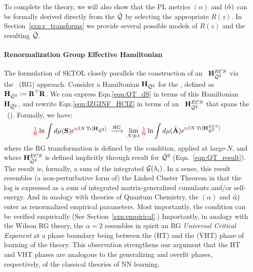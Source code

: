 To complete the theory, we
will also show that the \HTSR PL \LayerQuality metrics \ALPHA $(\alpha)$  and \ALPHAHAT $(\hat\alpha)$
can be formally derived directly from the \SETOL \LayerQuality $\bar{\mathcal{Q}}$ by selecting the appropriate
\RTransform $R(z)$. In Section~\ref{sxn:r_transforms} we provide several possible
models of $R(z)$ and the resulting \LayerQuality $\bar{\mathcal{Q}}$.

\paragraph{Renormalization Group Effective Hamiltonian}
The formulation of SETOL closely parallels the construction of an \EffectiveHamiltonian~$\mathbf{H}^{ECS}_{\bar{\mathcal{Q}}^{2}}$
via the \WilsonExactRenormalizationGroup~(RG) approach. Consider a \emph{\Bare} Hamiltonian $\mathbf{H}_{\bar{\mathcal{Q}}^{2}}$ for the \LayerQualitySquared,
defined as $\mathbf{H}_{\bar{\mathcal{Q}}^{2}}:= \mathbf{R}^{\top}\mathbf{R}$.
We can express Eqn.\ref{eqn:QT_dS} in terms of this \Bare Hamiltonian $\mathbf{H}_{\bar{\mathcal{Q}}^{2}}$,
and rewrite Eqn.\ref{eqn:IZGINF_HCIZ} in terms of an \emph{\Renormalized} \EffectiveHamiltonian~$\mathbf{H}^{ECS}_{\bar{\mathcal{Q}}^{2}}$
that spans the \EffectiveCorrelationSpace~(\ECS). Formally, we have:
\begin{align}
\label{eqn:RG}
{\color{red}\sf{\tfrac{1}{N}}}\ln \int d\mu({\mathbf{S}})e^{{\color{red}\sf{n}} \beta N \operatorname{Tr}[\mathbf{H}_{\bar{\mathcal{Q}}^{2}}]} \;\xrightarrow{RG}\; \lim_{N\gg 1}{\color{red}\sf{\tfrac{1}{N}}}\ln \int d\mu(\tilde{\mathbf{A}})e^{{\color{red}\sf{n}} \beta N \operatorname{Tr}[\mathbf{H}^{ECS}_{\bar{\mathcal{Q}}^{2}}]} 
\end{align}
where the RG transformation is defined by the \ScaleInvariant \TRACELOG condition,
applied at large-$N$,
and where $\mathbf{H}^{ECS}_{\bar{\mathcal{Q}}^{2}}$ is defined implicitly through result for $\bar{\mathcal{Q}}^{2}$ (Eqn.~\ref{eqn:QT_result}).
The result is, formally, a sum of the integrated \RTransforms $\mathcal{G}(\lambda_{i})$.
In a sense, this result resembles (a non-perturbative form of) the Linked Cluster Theorem
in that the log \PartitionFunction is expressed as a sum of integrated matrix-generalized cumulants and/or self-energy.  And in analogy with \SemiEmpirical theories of Quantum Chemistry, the \HTSR \ALPHA $(\alpha)$ and \ALPHAHAT $\hat\alpha)$ enter as renormalized empirical parameters.
Most importantly, the \ScaleInvariant \TRACELOG condition can be verified empirically (See Section~\ref{sxn:empirical}.)
Importantly, in analogy with the Wilson RG theory, 
the \HTSR $\alpha=2$ resembles in spirit
an RG \emph{Universal Critical Exponent} at a phase boundary being between the \HeavyTailed 
(HT) and the \VeryHeavyTailed (VHT) phase of learning of the \HTSR theory.
This observation strengthens our argument that the \HTSR HT and VHT phases
are analogous to the generalizing and overfit phases, respectively,
of the classical \SMOG theories of NN learning.


